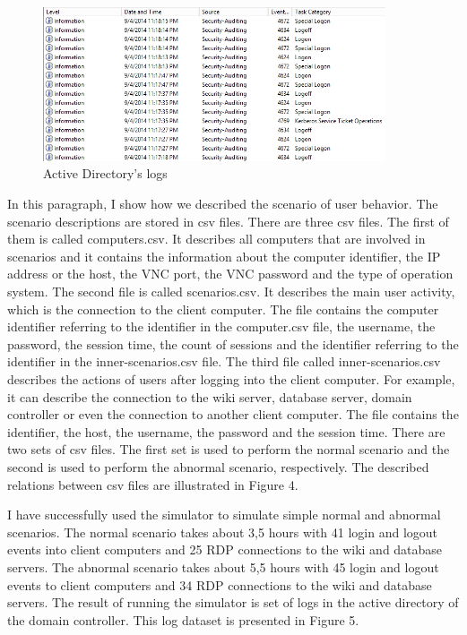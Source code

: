 \begin{figure}[ht!]
\centering
\includegraphics[width=0.9\textwidth]{active_directory_logs_result_2.png}
\caption{Active Directory's logs}
\label{overflow}
\end{figure}



In this paragraph, I show how we described the scenario of user behavior. The scenario descriptions are stored in csv files. There are three csv files. The first of them is called computers.csv. It describes all computers that are involved in scenarios and it contains the information about the computer identifier, the IP address or the host, the VNC port, the VNC password and the type of operation system.
The second file is called scenarios.csv. It describes the main user activity, which is the connection to the client computer. The file contains the computer identifier referring to the identifier in the computer.csv file, the username, the password, the session time, the count of sessions and the identifier referring to the identifier in the inner-scenarios.csv file. The third file called inner-scenarios.csv describes the actions of users after logging into the client computer. For example, it can describe the connection to the wiki server, database server, domain controller or even the connection to another client computer. The file contains the identifier, the host, the username, the password and the session time. There are two sets of csv files. The first set is used to perform the normal scenario and the second is used to perform the abnormal scenario, respectively. The described relations between csv files are illustrated in Figure 4.
 	
 	
I have successfully used the simulator to simulate simple normal and abnormal scenarios. The normal scenario takes about 3,5 hours with 41 login and logout events into client computers and 25 RDP connections to the wiki and database servers. The abnormal scenario takes about 5,5 hours with 45 login and logout events to client computers and 34 RDP connections to the wiki and database servers. The result of running the simulator is set of logs in the active directory of the domain controller. This log dataset is presented in Figure 5. 


 
% 